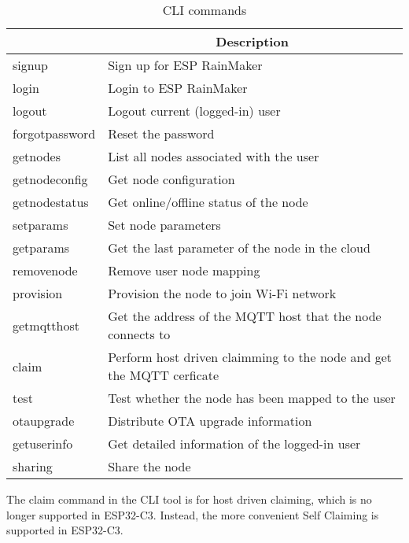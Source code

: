 \documentclass[a4paper,12pt]{book}
\begin{document}
\begin{table}[h!]
    \renewcommand{\arraystretch}{1.15}
    \caption{CLI commands}
    \begin{tabular}{|>{\ttfamily\small}m{8em}|m{31em}|}
        \hline
        \rowcolor{LightBlue} \multicolumn{1}{|c|}{\textbf{Command}}&\multicolumn{1}{c|}{\textbf{Description}}\\
        \hline
        signup&Sign up for ESP RainMaker\\
        \hline
        login&Login to ESP RainMaker\\
        \hline
        logout&Logout current (logged-in) user\\
        \hline
        forgotpassword&Reset the password\\
        \hline
        getnodes&List all nodes associated with the user\\
        \hline
        getnodeconfig&Get node configuration\\
        \hline
        getnodestatus&Get online/offline status of the node\\
        \hline
        setparams&Set node parameters\\
        \hline
        getparams&Get the last parameter of the node in the cloud\\
        \hline
        removenode&Remove user node mapping\\
        \hline
        provision&Provision the node to join Wi-Fi network\\
        \hline
        getmqtthost&Get the address of the MQTT host that the node connects to\\
        \hline
        claim&Perform host driven claimming to the node and get the MQTT cerficate\\
        \hline
        test&Test whether the node has been mapped to the user\\
        \hline
        otaupgrade&Distribute OTA upgrade information\\
        \hline
        getuserinfo&Get detailed information of the logged-in user\\
        \hline
        sharing&Share the node\\
        \hline
    \end{tabular}
\end{table}

The claim command in the CLI tool is for host driven claiming, which is no longer supported in ESP32-C3. Instead, the more convenient Self Claiming is supported in ESP32-C3.
\end{document}
